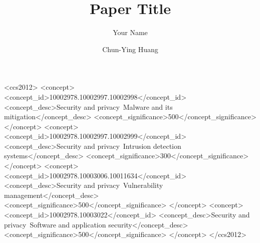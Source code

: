 \documentclass[sigconf]{acmart}
\begin{document}
\title{Paper Title}

\iffalse
\author{Anonymous Authors}
\authornotemark[1]
\email{anonymous@institution.com}
\affiliation{%
  \institution{Anonymous Institution}
  \city{Anonymous City}
  \country{Anonymous Country}
}
\fi

\author{Your Name}
\authornotemark[1]

\author{Chun-Ying Huang}
\authornotemark[1]

\begin{CCSXML}
<ccs2012>
<concept>
<concept_id>10002978.10002997.10002998</concept_id>
<concept_desc>Security and privacy~Malware and its mitigation</concept_desc>
<concept_significance>500</concept_significance>
</concept>
<concept>
<concept_id>10002978.10002997.10002999</concept_id>
<concept_desc>Security and privacy~Intrusion detection systems</concept_desc>
<concept_significance>300</concept_significance>
</concept>
<concept>
<concept_id>10002978.10003006.10011634</concept_id>
<concept_desc>Security and privacy~Vulnerability management</concept_desc>
<concept_significance>500</concept_significance>
</concept>
<concept>
<concept_id>10002978.10003022</concept_id>
<concept_desc>Security and privacy~Software and application security</concept_desc>
<concept_significance>500</concept_significance>
</concept>
</ccs2012>
\end{CCSXML}


\begin{abstract}

\end{abstract}


\maketitle





\end{document}
